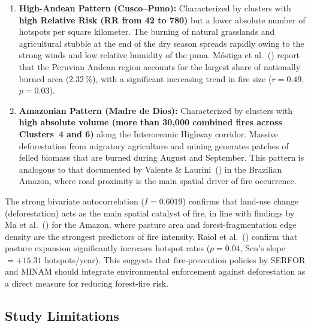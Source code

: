 \documentclass[preprint,12pt,authoryear]{elsarticle}
\begin{document}
	\begin{enumerate}[leftmargin=*, label=\arabic*.]
		\item \textbf{High-Andean Pattern (Cusco--Puno):} Characterized by
		clusters with \textbf{high Relative Risk (RR from 42 to
			780)} but a lower absolute number of hotspots per square
		kilometer. The burning of natural grasslands and
		agricultural stubble at the end of the dry season spreads
		rapidly owing to the strong winds and low relative humidity
		of the puna. M\'ostiga et al.\ (\citeyear{Mostiga2026}) report
		that the Peruvian Andean region accounts for the largest
		share of nationally burned area (2.32\,\%), with a
		significant increasing trend in fire size ($r = 0.49$,
		$p = 0.03$).
		
		\item \textbf{Amazonian Pattern (Madre de Dios):} Characterized by
		clusters with \textbf{high absolute volume (more than
			30{,}000 combined fires across Clusters~4 and 6)} along the
		Interoceanic Highway corridor. Massive deforestation from
		migratory agriculture and mining generates patches of
		felled biomass that are burned during August and September.
		This pattern is analogous to that documented by Valente
		\& Laurini\ (\citeyear{Valente2023}) in the Brazilian Amazon,
		where road proximity is the main spatial driver of fire
		occurrence.
	\end{enumerate}
	
	The strong bivariate autocorrelation ($I = 0.6019$) confirms that
	land-use change (deforestation) acts as the main spatial catalyst
	of fire, in line with findings by Ma et al.\ (\citeyear{Ma2022}) for the
	Amazon, where pasture area and forest-fragmentation edge density
	are the strongest predictors of fire intensity. Raiol et
	al.\ (\citeyear{Raiol2026}) confirm that pasture expansion significantly
	increases hotspot rates ($p = 0.04$, Sen's slope $= +15.31$
	hotspots/year). This suggests that fire-prevention policies by
	SERFOR and MINAM should integrate environmental enforcement against
	deforestation as a direct measure for reducing forest-fire risk.
	
	\subsection*{Study Limitations}
	
\end{document}

